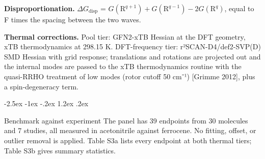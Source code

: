 \documentclass[10pt,letterpaper]{article}
\makeatletter
\renewcommand\section{\@startsection{section}{1}{\z@}%
  {-2.5ex \@plus -1ex \@minus -.2ex}%
  {1.2ex \@plus .2ex}%
  {\normalfont\large\bfseries\raggedright}}
\makeatother
\begin{document}
\textbf{Disproportionation.} $\Delta G_{\mathrm{disp}}$ = $G(\mathrm{R}^{q+1}) + G(\mathrm{R}^{q-1}) - 2G(\mathrm{R}^{q})$, equal to F times the spacing between the two waves.

\textbf{Thermal corrections.} Pool tier: GFN2-xTB Hessian at the DFT geometry, xTB thermodynamics at 298.15 K. DFT-frequency tier: r²SCAN-D4/def2-SVP(D) SMD Hessian with grid response; translations and rotations are projected out and the internal modes are passed to the xTB thermodynamics routine with the quasi-RRHO treatment of low modes (rotor cutoff 50 cm⁻¹) [Grimme 2012], plus a spin-degeneracy term.

\section{Benchmark against experiment}
The panel has 39 endpoints from 30 molecules and 7 studies, all measured in acetonitrile against ferrocene. No fitting, offset, or outlier removal is applied. Table S3a lists every endpoint at both thermal tiers; Table S3b gives summary statistics.
\end{document}
